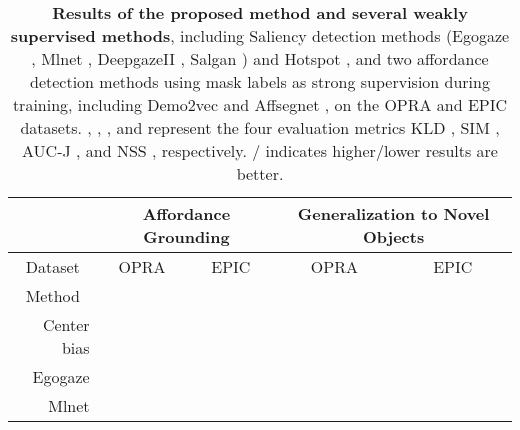 \documentclass[journal,twoside]{IEEEtran}
\begin{document}
\begin{table*}[!t]
  \begin{center}
  \small
  \renewcommand{\arraystretch}{1.}
  \renewcommand{\tabcolsep}{2.8pt}
   \caption{\textbf{Results of the proposed method and several weakly supervised methods}, including Saliency detection methods (Egogaze \cite{DBLP:conf/eccv/HuangCLS18}, Mlnet \cite{DBLP:conf/icpr/CorniaBSC16}, DeepgazeII \cite{DBLP:journals/corr/KummererWB16}, Salgan \cite{Pan_2017_SalGAN}) and Hotspot \cite{interaction-hotspots}, and two affordance detection methods using mask labels as strong supervision during training, including Demo2vec \cite{demo2vec2018cvpr} and Affsegnet \cite{interaction-hotspots}, on the OPRA \cite{demo2vec2018cvpr} and EPIC \cite{Damen2018EPICKITCHENS} datasets. , , , and  represent the four evaluation metrics KLD \cite{bylinskii2018different}, SIM \cite{swain1991color}, AUC-J \cite{DBLP:conf/iccv/JuddEDT09}, and NSS \cite{peters2005components}, respectively.  / indicates higher/lower results are better. 
   }
   \label{Table:1}
  \begin{tabular}{r|cccc|cccc|cccc|cccc}
    \hline\toprule
    \multicolumn{1}{c|}{\quad} & \multicolumn{8}{c|}{\textbf{Affordance Grounding}} & \multicolumn{8}{c}{\textbf{Generalization to Novel Objects}} \\ 
    \hline
    \multicolumn{1}{c|}{Dataset} & \multicolumn{4}{c|}{OPRA \cite{demo2vec2018cvpr}} & \multicolumn{4}{c|}{EPIC \cite{Damen2018EPICKITCHENS}} & \multicolumn{4}{c|}{OPRA \cite{demo2vec2018cvpr}} & \multicolumn{4}{c}{EPIC \cite{Damen2018EPICKITCHENS}}\\ 
    \hline
    \multicolumn{1}{c|}{Method} & \emph{} & \emph{} & \emph{} & \emph{} & \emph{} & \emph{} & \emph{} &  \emph{} & \emph{} & \emph{} & \emph{} & \emph{} & \emph{} & \emph{} & \emph{} & \emph{} \\ 
    \hline
    Center bias &  &  &  &  &  &  & 	&  &  &	 &  &  & 	 &  &  &   \\
   Egogaze \cite{DBLP:conf/eccv/HuangCLS18} & 	\cellcolor{gray!20} &  &  & 	 &	 \cellcolor{gray!20} &  &  &  & \cellcolor{gray!20} &  &	 &  & \cellcolor{gray!20} &  &  &     \\
   Mlnet \cite{DBLP:conf/icpr/CorniaBSC16}	&  &	\cellcolor{gray!20}	& \cellcolor{gray!35} &	\cellcolor{gray!35} &  & \cellcolor{gray!20} & \cellcolor{gray!20} &	\cellcolor{gray!20} &  & \cellcolor{gray!20} & \cellcolor{gray!35} &	\cellcolor{gray!35} &  & \cellcolor{gray!20} & \cellcolor{gray!35} &	\cellcolor{gray!20}   \\

\end{tabular}
\end{center}
\end{table*}
\end{document}
